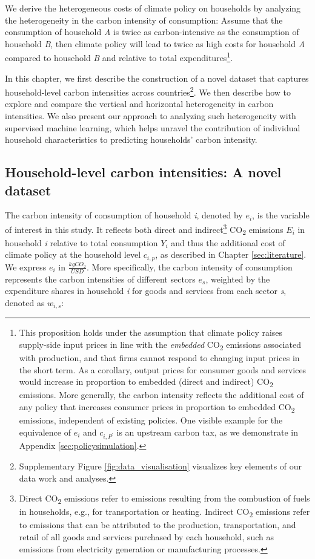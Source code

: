 \documentclass[12pt, a4paper]{article}
\begin{document}
We derive the heterogeneous costs of climate policy on households by analyzing the heterogeneity in the carbon intensity of consumption: Assume that the consumption of household \textit{A} is twice as carbon-intensive as the consumption of household \textit{B}, then climate policy will lead to twice as high costs for household \textit{A} compared to household \textit{B} and relative to total expenditures\footnote{This proposition holds under the assumption that climate policy raises supply-side input prices in line with the \textit{embedded} CO\textsubscript{2} emissions associated with production, and that firms cannot respond to changing input prices in the short term. As a corollary, output prices for consumer goods and services would increase in proportion  to embedded (direct and indirect) CO\textsubscript{2} emissions. More generally, the carbon intensity reflects the additional cost of any policy that increases consumer prices in proportion to embedded CO\textsubscript{2} emissions, independent of existing policies. One visible example for the equivalence of $e_{i}$ and $c_{i,P^{\prime}}$ is an upstream carbon tax, as we demonstrate in Appendix \ref{sec:policysimulation}.}.

In this chapter, we first describe the construction of a novel dataset that captures household-level carbon intensities across countries\footnote{Supplementary Figure \ref{fig:data_visualisation} visualizes key elements of our data work and analyses.}. We then describe how to explore and compare the vertical and horizontal heterogeneity in carbon intensities. We also present our approach to analyzing such heterogeneity with supervised machine learning, which helps unravel the contribution of individual household characteristics to predicting households' carbon intensity.

\subsection{Household-level carbon intensities: A novel dataset} \label{sec:data}

The carbon intensity of consumption of household \textit{i}, denoted by $e_{i}$, is the variable of interest in this study. It reflects both direct and indirect\footnote{Direct CO\textsubscript{2} emissions refer to emissions resulting from the combustion of fuels in households, e.g., for transportation or heating. Indirect CO\textsubscript{2} emissions refer to emissions that can be attributed to the production, transportation, and retail of all goods and services purchased by each household, such as emissions from electricity generation or manufacturing processes.} CO\textsubscript{2} emissions $E_{i}$ in household \textit{i} relative to total consumption $Y_{i}$ and thus the additional cost of climate policy at the household level $c_{i,p}$, as described in Chapter \ref{sec:literature}. We express $e_{i}$ in $\frac{kgCO_{2}}{USD}$. More specifically, the carbon intensity of consumption represents the carbon intensities of different sectors $e_{s}$, weighted by the expenditure shares in household \textit{i} for goods and services from each sector \textit{s}, denoted as $w_{i,s}$:
\end{document}
